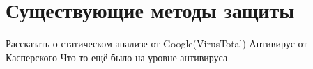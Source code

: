 \section{Существующие методы защиты}

Рассказать о статическом анализе от Google(VirusTotal)
Антивирус от Касперского
Что-то ещё было на уровне антивируса
